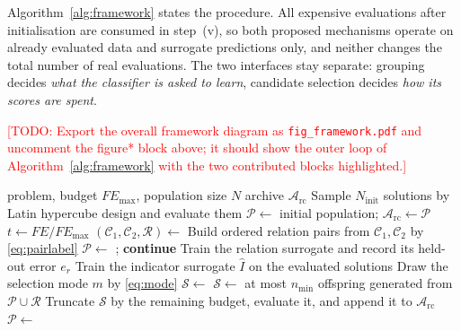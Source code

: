 \documentclass[final,5p,times,twocolumn]{elsarticle}
\newcommand{\TODO}[1]{\textcolor{red}{[TODO: #1]}}
\begin{document}
Algorithm~\ref{alg:framework} states the procedure. All expensive evaluations
after initialisation are consumed in step~(v), so both proposed mechanisms operate on already
evaluated data and surrogate predictions only, and neither changes the total
number of real evaluations. The two interfaces stay separate: grouping
decides \emph{what the classifier is asked to learn}, candidate selection
decides \emph{how its scores are spent}.

\TODO{Export the overall framework diagram as \texttt{fig\_framework.pdf} and
uncomment the figure* block above; it should show the outer loop of
Algorithm~\ref{alg:framework} with the two contributed blocks highlighted.}

\begin{algorithm}[t]
\caption{HPDC-MaOEA}
\label{alg:framework}
\begin{algorithmic}[1]
\Require problem, budget $FE_{\max}$, population size $N$
\Ensure archive $\mathcal{A}_{\mathrm{rc}}$
\State Sample $N_{\mathrm{init}}$ solutions by Latin hypercube design and
       evaluate them
\State $\mathcal{P}\gets$ initial population;
       $\mathcal{A}_{\mathrm{rc}}\gets\mathcal{P}$
  \State $t\gets FE/FE_{\max}$
  \State $(\mathcal{C}_1,\mathcal{C}_2,\mathcal{R})\gets$
  \State Build ordered relation pairs from $\mathcal{C}_1,\mathcal{C}_2$ by
         \eqref{eq:pairlabel}
    \State $\mathcal{P}\gets$
           ;
           \textbf{continue}
  \EndIf
  \State Train the relation surrogate and record its held-out error $e_r$
  \State Train the indicator surrogate $\widehat I$ on the evaluated solutions
  \State Draw the selection mode $m$ by \eqref{eq:mode}
  \State $\mathcal{S}\gets$
    \State $\mathcal{S}\gets$ at most $n_{\min}$ offspring generated from
           $\mathcal{P}\cup\mathcal{R}$
  \EndIf
  \State Truncate $\mathcal{S}$ by the remaining budget, evaluate it, and
         append it to $\mathcal{A}_{\mathrm{rc}}$
  \State $\mathcal{P}\gets$ 
\EndWhile
\end{algorithmic}
\end{algorithm}
\end{document}
